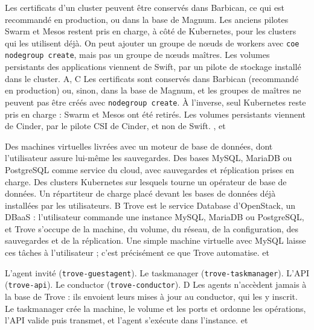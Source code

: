   {Les certificats d'un cluster peuvent être conservés dans Barbican, ce qui est recommandé en production, ou dans la base de Magnum.}
  {Les anciens pilotes Swarm et Mesos restent pris en charge, à côté de Kubernetes, pour les clusters qui les utilisent déjà.}
  {On peut ajouter un groupe de nœuds de workers avec \texttt{coe nodegroup create}, mais pas un groupe de nœuds maîtres.}
  {Les volumes persistants des applications viennent de Swift, par un pilote de stockage installé dans le cluster.}
  {A, C}
  {Les certificats sont conservés dans Barbican (recommandé en production) ou, sinon, dans la base de Magnum, et les groupes de maîtres ne peuvent pas être créés avec \texttt{nodegroup create}. À l'inverse, seul Kubernetes reste pris en charge : Swarm et Mesos ont été retirés. Les volumes persistants viennent de Cinder, par le pilote CSI de Cinder, et non de Swift.}
  {,  et }


  {Des machines virtuelles livrées avec un moteur de base de données, dont l'utilisateur assure lui-même les sauvegardes.}
  {Des bases MySQL, MariaDB ou PostgreSQL comme service du cloud, avec sauvegardes et réplication prises en charge.}
  {Des clusters Kubernetes sur lesquels tourne un opérateur de base de données.}
  {Un répartiteur de charge placé devant les bases de données déjà installées par les utilisateurs.}
  {B}
  {Trove est le service Database d'OpenStack, un DBaaS : l'utilisateur commande une instance MySQL, MariaDB ou PostgreSQL, et Trove s'occupe de la machine, du volume, du réseau, de la configuration, des sauvegardes et de la réplication. Une simple machine virtuelle avec MySQL laisse ces tâches à l'utilisateur ; c'est précisément ce que Trove automatise.}
  { et }

  {L'agent invité (\texttt{trove-guestagent}).}
  {Le taskmanager (\texttt{trove-taskmanager}).}
  {L'API (\texttt{trove-api}).}
  {Le conductor (\texttt{trove-conductor}).}
  {D}
  {Les agents n'accèdent jamais à la base de Trove : ils envoient leurs mises à jour au conductor, qui les y inscrit. Le taskmanager crée la machine, le volume et les ports et ordonne les opérations, l'API valide puis transmet, et l'agent s'exécute dans l'instance.}
  { et }

